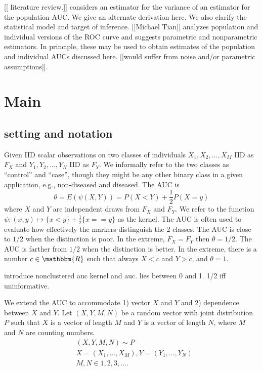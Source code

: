 \message{ !name(manuscript.tex)}\documentclass[12pt]{article}
\newcommand{\E}{E}
\renewcommand{\P}{P}
\newcommand{\kernel}{\psi}
\begin{document}
[[ literature review.]]
\cite{obuchowski1997} considers an estimator for the variance of an estimator for
the population AUC. We give an alternate derivation here. We also
clarify the statistical model and target of inference. [[Michael
Tian]] analyzes population and individual versions of the ROC curve
and suggests parametric and nonparametric estimators. In principle,
these may be used to obtain estimates of the population and individual
AUCs discussed here. [[would suffer from noise and/or parametric
assumptions]].


\section{Main}


\subsection{setting and notation}

Given IID scalar observations on two classes of individuals
$X_1,X_2,\ldots,X_M$ IID as $F_X$ and $Y_1,Y_2,\ldots,Y_N$ IID as
$F_Y$. We informally refer to the two classes as ``control'' and
``case'', though they might be any other binary class in a given
application, e.g., non-diseased and diseased. The AUC is
$$\theta=\E(\kernel(X,Y))=\P(X<Y)+\frac{1}{2}\P(X=y)$$%
where $X$ and $Y$ are independent draws from $F_X$ and $F_Y$.  We refer to the function $\psi:(x,y)\mapsto\{x<y\}+\frac{1}{2}\{x==y\}$ as the kernel. The AUC
is often used to evaluate how effectively the markers distinguish the
2 classes. The AUC is close to $1/2$ when the distinction is poor. In
the extreme, $F_X=F_Y$ then $\theta=1/2$. The AUC is farther from
$1/2$ when the distinction is better. In the extreme, there is a number $c\in\mathbbm{R}$ such that always $X<c$ and $Y>c$, and $\theta=1$.

introduce nonclustered auc kernel and auc. lies between 0 and 1. 1/2 iff uninformative.


We extend the AUC to accommodate 1) vector $X$ and $Y$ and 2)
dependence between $X$ and $Y$. Let $(X,Y,M,N)$ be a random vector
with joint distribution $\P$ such that $X$ is a vector of length $M$
and $Y$ is a vector of length $N$, where $M$ and $N$ are counting
numbers.
\begin{align}
  &(X,Y,M,N) \sim \P\\
  &X=(X_1,\ldots,X_M), Y=(Y_1,\ldots,Y_N)\\
  &M,N \in 1,2,3,\ldots .
\end{align}
\end{document}
